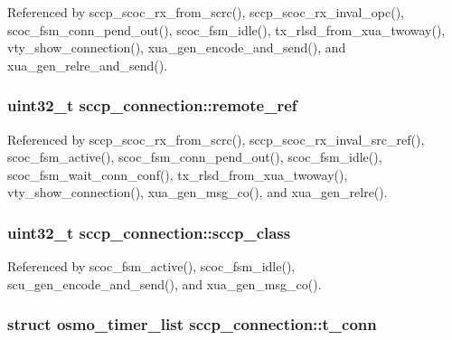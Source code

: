Referenced by sccp\+\_\+scoc\+\_\+rx\+\_\+from\+\_\+scrc(), sccp\+\_\+scoc\+\_\+rx\+\_\+inval\+\_\+opc(), scoc\+\_\+fsm\+\_\+conn\+\_\+pend\+\_\+out(), scoc\+\_\+fsm\+\_\+idle(), tx\+\_\+rlsd\+\_\+from\+\_\+xua\+\_\+twoway(), vty\+\_\+show\+\_\+connection(), xua\+\_\+gen\+\_\+encode\+\_\+and\+\_\+send(), and xua\+\_\+gen\+\_\+relre\+\_\+and\+\_\+send().

\subsubsection[{remote\+\_\+ref}]{\setlength{\rightskip}{0pt plus 5cm}uint32\+\_\+t sccp\+\_\+connection\+::remote\+\_\+ref}\label{structsccp__connection_abf42a5100a877072f0ea0e2f7aedccd7}


Referenced by sccp\+\_\+scoc\+\_\+rx\+\_\+from\+\_\+scrc(), sccp\+\_\+scoc\+\_\+rx\+\_\+inval\+\_\+src\+\_\+ref(), scoc\+\_\+fsm\+\_\+active(), scoc\+\_\+fsm\+\_\+conn\+\_\+pend\+\_\+out(), scoc\+\_\+fsm\+\_\+idle(), scoc\+\_\+fsm\+\_\+wait\+\_\+conn\+\_\+conf(), tx\+\_\+rlsd\+\_\+from\+\_\+xua\+\_\+twoway(), vty\+\_\+show\+\_\+connection(), xua\+\_\+gen\+\_\+msg\+\_\+co(), and xua\+\_\+gen\+\_\+relre().

\subsubsection[{sccp\+\_\+class}]{\setlength{\rightskip}{0pt plus 5cm}uint32\+\_\+t sccp\+\_\+connection\+::sccp\+\_\+class}\label{structsccp__connection_ae81a569e9b665b724d4aae804f279272}


Referenced by scoc\+\_\+fsm\+\_\+active(), scoc\+\_\+fsm\+\_\+idle(), scu\+\_\+gen\+\_\+encode\+\_\+and\+\_\+send(), and xua\+\_\+gen\+\_\+msg\+\_\+co().

\subsubsection[{t\+\_\+conn}]{\setlength{\rightskip}{0pt plus 5cm}struct osmo\+\_\+timer\+\_\+list sccp\+\_\+connection\+::t\+\_\+conn}\label{structsccp__connection_a0c519a633b9f3a84fbfe68c5ce776dfe}


